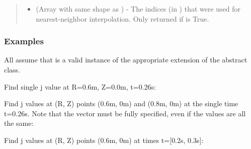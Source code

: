 \documentclass[letterpaper,10pt,english]{sphinxmanual}
\begin{document}
\begin{fulllineitems}
\begin{fulllineitems}
\begin{quote}
\begin{description}
\begin{itemize}
\item {} 
 (Array with same shape as ) - The indices
(in ) that were used for
nearest-neighbor interpolation. Only returned if  is
True.

\end{itemize}


\end{description}\end{quote}
\subsubsection*{Examples}

All assume that  is a valid instance of the appropriate
extension of the {\hyperref[\detokenize{eqtools:eqtools.core.Equilibrium}]{}} abstract class.

Find single j value at R=0.6m, Z=0.0m, t=0.26s:

\begin{sphinxVerbatim}[commandchars=\\\{\}]
    
\end{sphinxVerbatim}

Find j values at (R, Z) points (0.6m, 0m) and (0.8m, 0m) at the
single time t=0.26s. Note that the  vector must be fully
specified, even if the values are all the same:

\begin{sphinxVerbatim}[commandchars=\\\{\}]
  \PYG{p}{[} \PYG{p}{]} \PYG{p}{[} \PYG{p}{]} 
\end{sphinxVerbatim}

Find j values at (R, Z) points (0.6m, 0m) at times t={[}0.2s, 0.3s{]}:

\begin{sphinxVerbatim}[commandchars=\\\{\}]
    \PYG{p}{[} \PYG{p}{]}
\end{sphinxVerbatim}


\end{fulllineitems}
\end{fulllineitems}
\end{document}
